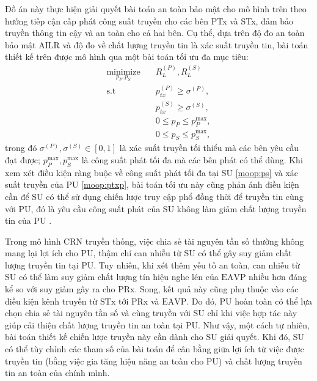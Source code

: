 \documentclass[../main.tex]{subfiles}
\begin{document}
Đồ án này thực hiện giải quyết bài toán an toàn bảo mật cho mô hình trên theo hướng tiếp cận cấp phát công suất truyền cho các bên PTx và STx, đảm bảo truyền thông tin cậy và an toàn cho cả hai bên. Cụ thể, dựa trên độ đo an toàn bảo mật AILR và độ đo về chất lượng truyền tin là xác suất truyền tin, bài toán thiết kế trên được mô hình qua một bài toán tối ưu đa mục tiêu:
\begin{subequations}\label{moop}
\begin{align}
\underset{p_P, p_S}{\text{minimize}} \quad & R_{L}^{(P)}, R_{L}^{(S)} \nonumber \\
\text{s.t} 
\quad & p_{tx}^{(P)} \geq \sigma^{(P)}, \label{moop:ptxp}\\
\quad & p_{tx}^{(S)} \geq \sigma^{(S)}, \label{moop:ptxs}\\
\quad & 0 \leq p_P \leq p_P^\text{max}, \label{moop:pp}\\
\quad & 0 \leq p_S \leq p_S^\text{max}, \label{moop:ps}
\end{align}
\end{subequations}
trong đó $\sigma^{(P)}, \sigma^{(S)} \in [0, 1]$ là xác suất truyền tối thiểu mà các bên yêu cầu đạt được; $p_P^\text{max}, p_S^\text{max}$ là công suất phát tối đa mà các bên phát có thể dùng. Khi xem xét điều kiện ràng buộc về công suất phát tối đa tại SU \eqref{moop:ps} và xác suất truyền của PU \eqref{moop:ptxp}, bài toán tối ưu này cũng phản ánh điều kiện cần để SU có thể sử dụng chiến lược truy cập phổ đồng thời để truyền tin cùng với PU, đó là yêu cầu công suất phát của SU không làm giảm chất lượng truyền tin của PU \cite{tran2017cognitive,quach2017secrecy}.

Trong mô hình CRN truyền thống, việc chia sẻ tài nguyên tần số thường không mang lại lợi ích cho PU, thậm chí can nhiễu từ SU có thể gây suy giảm chất lượng truyền tin tại PU. Tuy nhiên, khi xét thêm yếu tố an toàn, can nhiễu từ SU có thể làm suy giảm chất lượng tín hiệu nghe lén của $\text{EAVP}$ nhiều hơn đáng kể so với suy giảm gây ra cho $\text{PRx}$. Song, kết quả này cũng phụ thuộc vào các điều kiện kênh truyền từ $\text{STx}$ tới $\text{PRx}$ và $\text{EAVP}$. Do đó, PU hoàn toàn có thể lựa chọn chia sẻ tài nguyên tần số và cùng truyền với SU chỉ khi việc hợp tác này giúp cải thiện chất lượng truyền tin an toàn tại PU. Như vậy, một cách tự nhiên, bài toán thiết kế chiến lược truyền này cần dành cho SU giải quyết. Khi đó, SU có thể tùy chỉnh các tham số của bài toán để cân bằng giữa lợi ích từ việc được truyền tin (bằng việc gia tăng hiệu năng an toàn cho PU) và chất lượng truyền tin an toàn của chính mình.
\end{document}

